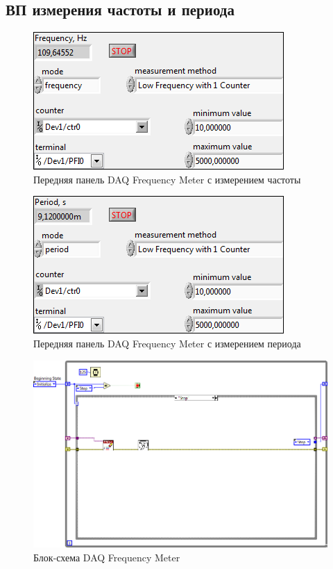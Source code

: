 \documentclass[a4paper,14pt]{article}
\begin{document}
\subsection{ВП измерения частоты и периода}

\begin{figure}[H]
	\centering
	\includegraphics[width=\linewidth]{image/dfm_freq_vi}
	\caption{Передняя панель DAQ Frequency Meter с измерением частоты}\label{img:dfm_freq_vi}
\end{figure}

\begin{figure}[H]
	\centering
	\includegraphics[width=\linewidth]{image/dfm_period_vi}
	\caption{Передняя панель DAQ Frequency Meter с измерением периода}\label{img:dfm_period_vi}
\end{figure}

\begin{figure}[H]
	\centering
	\includegraphics[width=\linewidth]{image/dfm_schema}
	\caption{Блок-схема DAQ Frequency Meter}\label{img:dfm_schema}
\end{figure}
\end{document}
